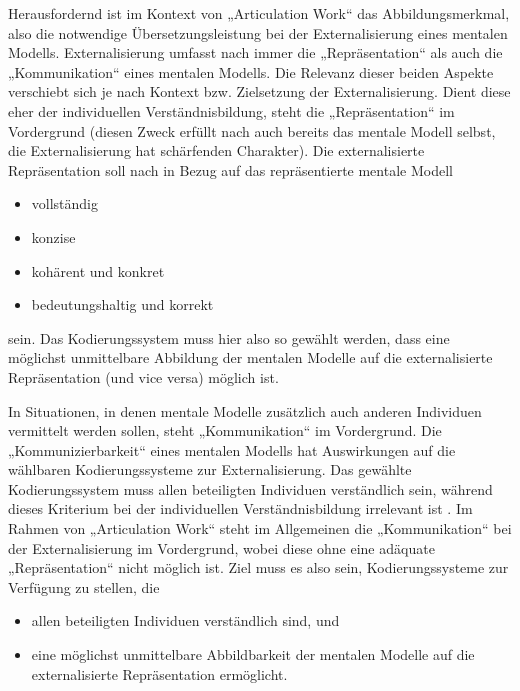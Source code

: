 Herausfordernd ist im Kontext von „Articulation Work“ das Abbildungsmerkmal, also die notwendige Übersetzungsleistung bei der Externalisierung eines mentalen Modells. Externalisierung umfasst nach \citet{Hanke06} immer die „Repräsentation“ als auch die „Kommunikation“ eines mentalen Modells. Die Relevanz dieser beiden Aspekte verschiebt sich je nach Kontext bzw. Zielsetzung der Externalisierung. Dient diese eher der individuellen Verständnisbildung, steht die „Repräsentation“ im Vordergrund (diesen Zweck erfüllt nach \citep{Seel91} auch bereits das mentale Modell selbst, die Externalisierung hat schärfenden Charakter). Die externalisierte Repräsentation soll nach \citet[][S. 187]{Seel91} in Bezug auf das repräsentierte mentale Modell
\begin{itemize}
	\item vollständig 
	\item konzise
	\item kohärent und konkret
	\item bedeutungshaltig und korrekt
\end{itemize}
sein. Das Kodierungssystem muss hier also so gewählt werden, dass eine möglichst unmittelbare Abbildung der mentalen Modelle auf die externalisierte Repräsentation (und vice versa) möglich ist. 

In Situationen, in denen mentale Modelle zusätzlich auch anderen Individuen vermittelt werden sollen, steht „Kommunikation“ im Vordergrund. Die „Kommunizierbarkeit“ eines mentalen Modells hat Auswirkungen auf die wählbaren Kodierungssysteme zur Externalisierung. Das gewählte Kodierungssystem muss allen beteiligten Individuen verständlich sein, während dieses Kriterium bei der individuellen Verständnisbildung irrelevant ist \citep{Hanke06}. Im Rahmen von „Articulation Work“ steht im Allgemeinen die „Kommunikation“ bei der Externalisierung im Vordergrund, wobei diese ohne eine adäquate „Repräsentation“ nicht möglich ist. Ziel muss es also sein, Kodierungssysteme zur Verfügung zu stellen, die 
\begin{itemize}
	\item allen beteiligten Individuen verständlich sind, und
	\item eine möglichst unmittelbare Abbildbarkeit der mentalen Modelle auf die externalisierte Repräsentation ermöglicht.
\end{itemize}

